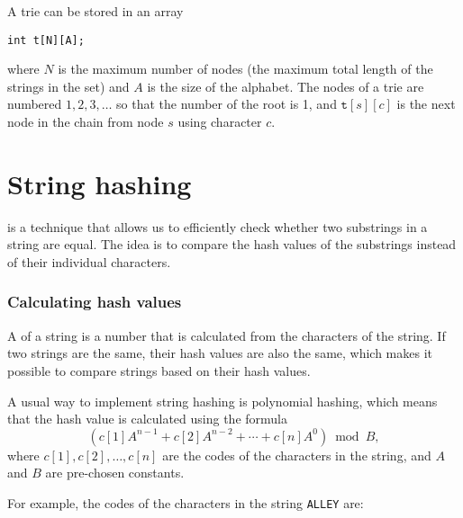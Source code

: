 A trie can be stored in an array
\begin{lstlisting}
int t[N][A];
\end{lstlisting}
where $N$ is the maximum number of nodes
(the maximum total length of the strings in the set)
and $A$ is the size of the alphabet.
The nodes of a trie are numbered
$1,2,3,\ldots$ so that the number of the root is 1,
and $\texttt{t}[s][c]$ is the next node in the chain
from node $s$ using character $c$.

\section{String hashing}


 is a technique that
allows us to efficiently check whether two
substrings in a string are equal.
The idea is to compare the hash values of the
substrings instead of their individual characters.

\subsubsection*{Calculating hash values}


A  of a string is
a number that is calculated from the characters
of the string.
If two strings are the same,
their hash values are also the same,
which makes it possible to compare strings
based on their hash values.

A usual way to implement string hashing
is polynomial hashing, which means
that the hash value is calculated using the formula
\[(c[1] A^{n-1} + c[2] A^{n-2} + \cdots + c[n] A^0) \bmod B  ,\]
where $c[1],c[2],\ldots,c[n]$
are the codes of the characters in the string,
and $A$ and $B$ are pre-chosen constants.

For example, the codes of the characters
in the string \texttt{ALLEY} are:
\begin{center}
\end{center}


